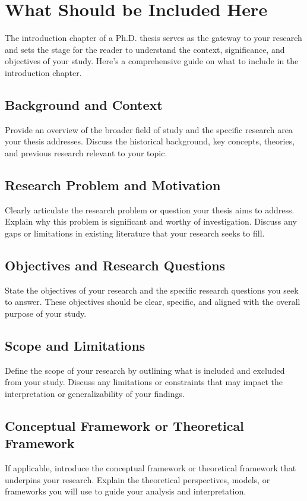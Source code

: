 \section{What Should be Included Here}
The introduction chapter of a Ph.D. thesis serves as the gateway to your research and sets the stage for the reader to understand the context, significance, and objectives of your study.
Here's a comprehensive guide on what to include in the introduction chapter.

\subsection{Background and Context}
Provide an overview of the broader field of study and the specific research area your thesis addresses.
Discuss the historical background, key concepts, theories, and previous research relevant to your topic.

\subsection{Research Problem and Motivation}
Clearly articulate the research problem or question your thesis aims to address.
Explain why this problem is significant and worthy of investigation.
Discuss any gaps or limitations in existing literature that your research seeks to fill.

\subsection{Objectives and Research Questions}
State the objectives of your research and the specific research questions you seek to answer.
These objectives should be clear, specific, and aligned with the overall purpose of your study.

\subsection{Scope and Limitations}
Define the scope of your research by outlining what is included and excluded from your study.
Discuss any limitations or constraints that may impact the interpretation or generalizability of your findings.

\subsection{Conceptual Framework or Theoretical Framework}
If applicable, introduce the conceptual framework or theoretical framework that underpins your research.
Explain the theoretical perspectives, models, or frameworks you will use to guide your analysis and interpretation.

